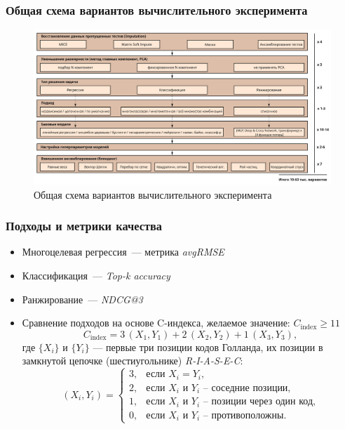 \documentclass
  [ russian
  , aspectratio=169 %
  ] {beamer}
\begin{document}
\begin{frame}
    \frametitle{Общая схема вариантов вычислительного эксперимента}
    \begin{figure}
        \centering
        \includegraphics[width=0.9\linewidth]{figures/multi_pipeline.jpg}
        \vspace{-0.9em}
        \captionsetup{font=footnotesize}
        \caption{Общая схема вариантов вычислительного эксперимента}
        \label{fig:multi_pipeline}
    \end{figure}
\end{frame}


\begin{frame}
    \frametitle{Подходы и метрики качества}
    \begin{itemize}
        \item Многоцелевая регрессия~--- метрика \emph{avgRMSE}
        \item Классификация~--- \emph{Top-k accuracy}
        \item Ранжирование~--- \emph{NDCG@3}
    \vspace{0.6em}
    \item Сравнение подходов на основе C-индекса, желаемое значение: $C_\text{index} \geq 11$
  \[
    C_\text{index} = 3\, (X_1, Y_1) + 2\, (X_2, Y_2) + 1\, (X_3, Y_3),
  \]
  где $\{X_i\}$ и $\{Y_i\}$ — первые три позиции кодов Голланда, их позиции в замкнутой цепочке (шестиугольнике) \textit{R-I-A-S-E-C}:
  \[
    (X_i, Y_i) =
    \begin{cases}
      3, & \text{если $X_i = Y_i$,}\\
      2, & \text{если $X_i$ и $Y_i$ -- соседние позиции,}\\
      1, & \text{если $X_i$ и $Y_i$ -- позиции через один код,}\\
      0, & \text{если $X_i$ и $Y_i$ -- противоположны.}
    \end{cases}
  \]
  \end{itemize}
\end{frame}
\end{document}
